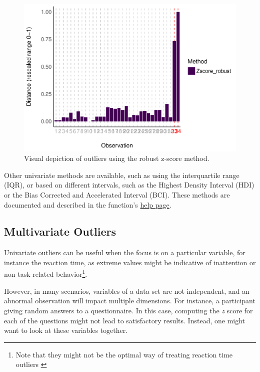 \documentclass[mathematics,article,submit,moreauthors,pdftex]{mdpi}
\begin{document}
\begin{figure}
\includegraphics[width=1\linewidth]{paper_files/figure-latex/univariate-1} \caption{Visual depiction of outliers using the robust z-score method.}\label{fig:univariate}
\end{figure}

Other univariate methods are available, such as using the interquartile
range (IQR), or based on different intervals, such as the Highest
Density Interval (HDI) or the Bias Corrected and Accelerated Interval
(BCI). These methods are documented and described in the function's
\href{https://easystats.github.io/performance/reference/check_outliers.html}{help
page}.

\hypertarget{multivariate-outliers}{%
\subsection{Multivariate Outliers}\label{multivariate-outliers}}

Univariate outliers can be useful when the focus is on a particular
variable, for instance the reaction time, as extreme values might be
indicative of inattention or non-task-related behavior\footnote{ Note
  that they might not be the optimal way of treating reaction time
  outliers \citep{ratcliff1993methods, van1995statistical}}.

However, in many scenarios, variables of a data set are not independent,
and an abnormal observation will impact multiple dimensions. For
instance, a participant giving random answers to a questionnaire. In
this case, computing the \emph{z} score for each of the questions might
not lead to satisfactory results. Instead, one might want to look at
these variables together.
\end{document}
